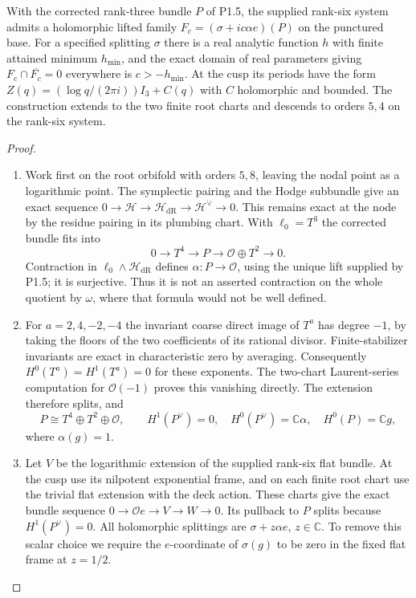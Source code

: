 \begin{theorem}\label{night:P1.8}
With the corrected rank-three bundle $P$ of P1.5, the supplied rank-six
system admits a holomorphic lifted family
$F_c=(\sigma+ic\alpha e)(P)$ on the punctured base.
For a specified splitting $\sigma$ there is a real analytic function
$h$ with finite attained minimum $h_{\min}$, and the exact domain of
real parameters giving $F_c\cap\overline{F_c}=0$ everywhere is
$c>-h_{\min}$.
At the cusp its periods have the form
$Z(q)=(\log q/(2\pi i))I_3+C(q)$ with $C$ holomorphic and bounded.
The construction extends to the two finite root charts and descends to
orders $5,4$ on the rank-six system.
\end{theorem}
\begin{proof}
\begin{enumerate}[label=\arabic*.]
\item Work first on the root orbifold with orders $5,8$, leaving the nodal
point as a logarithmic point.  The symplectic pairing and the Hodge
subbundle give an exact sequence
$0\to\mathcal H\to\mathcal H_{\mathrm{dR}}\to\mathcal H^\vee\to0$.
This remains exact at the node by the residue pairing in its plumbing
chart.  With $\ell_0=T^3$ the corrected bundle fits into
\[
0\longrightarrow T^4\longrightarrow P
 \longrightarrow\mathcal O\oplus T^2\longrightarrow0.
\]
Contraction in $\ell_0\wedge\mathcal H_{\mathrm{dR}}$ defines
$\alpha:P\to\mathcal O$, using the unique lift supplied by P1.5;
it is surjective.  Thus it is not an asserted contraction on the whole
quotient by $\omega$, where that formula would not be well defined.

\item For $a=2,4,-2,-4$ the invariant coarse direct image of $T^a$ has degree
$-1$, by taking the floors of the two coefficients of its rational
divisor.  Finite-stabilizer invariants are exact in characteristic zero
by averaging.  Consequently $H^0(T^a)=H^1(T^a)=0$ for these exponents.
The two-chart Laurent-series computation for $\mathcal O(-1)$ proves
this vanishing directly.  The extension therefore splits, and
\[
P\cong T^4\oplus T^2\oplus\mathcal O,\qquad
H^1(P^\vee)=0,\quad H^0(P^\vee)=\mathbb C\alpha,
\quad H^0(P)=\mathbb Cg,
\]
where $\alpha(g)=1$.

\item Let $V$ be the logarithmic extension of the supplied rank-six flat
bundle.  At the cusp use its nilpotent exponential frame, and on each
finite root chart use the trivial flat extension with the deck action.
These charts give the exact bundle sequence
$0\to\mathcal Oe\to V\to W\to0$.
Its pullback to $P$ splits because $H^1(P^\vee)=0$.
All holomorphic splittings are $\sigma+z\alpha e$, $z\in\mathbb C$.
To remove this scalar choice we require the $e$-coordinate of
$\sigma(g)$ to be zero in the fixed flat frame at $z=1/2$.


\end{enumerate}
\end{proof}
